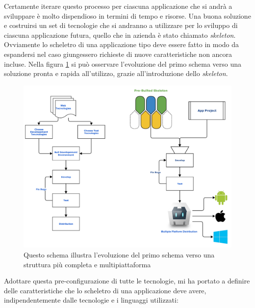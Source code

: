 Certamente iterare questo processo per ciascuna applicazione che si andrà a sviluppare è molto dispendioso in termini di tempo e risorse. Una buona soluzione e costruirsi un set di tecnologie che si andranno a utilizzare per lo sviluppo di ciascuna applicazione futura, quello che in azienda è stato chiamato \emph{skeleton}. Ovviamente lo scheletro di una applicazione tipo deve essere fatto in modo da espandersi nel caso giungessero richieste di nuove caratteristiche non ancora incluse. Nella figura \ref{fig:flow_match} si può osservare l'evoluzione del primo schema verso una soluzione pronta e rapida all'utilizzo, grazie all'introduzione dello \emph{skeleton}.

\begin{figure}
	\begin{center}
		\includegraphics[scale=0.5]{Figures/match_flow.pdf}
		\caption[Schemi di sviluppo a confronto]{Questo schema illustra l'evoluzione del primo schema verso una struttura più completa e multipiattaforma}
		\label{fig:flow_match}
	\end{center}
\end{figure}

Adottare questa pre-configurazione di tutte le tecnologie, mi ha portato a definire delle caratteristiche che lo scheletro di una applicazione deve avere, indipendentemente dalle tecnologie e i linguaggi utilizzati:

